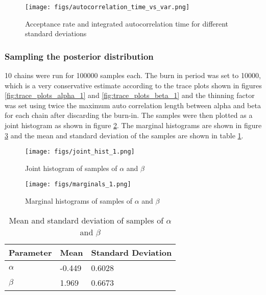\documentclass[11pt]{article}
\begin{document}
\begin{figure}[H]
    \centering
    \texttt{[image: figs/autocorrelation\_time\_vs\_var.png]}
    \caption{Acceptance rate and integrated autocorrelation time for different standard deviations}
    \label{fig:std_tuning}
\end{figure}

\subsubsection{Sampling the posterior distribution}
10 chains were run for 100000 samples each. The burn in period was set to 10000, which is a very conservative estimate according to the trace plots shown in figures \ref{fig:trace_plots_alpha_1} and \ref{fig:trace_plots_beta_1} and the thinning factor was set using twice the maximum auto correlation length between alpha and beta for each chain after discarding the burn-in. The samples were then plotted as a joint histogram as shown in figure \ref{fig:joint_hist_1}. The marginal histograms are shown in figure \ref{fig:marginal_hist} and the mean and standard deviation of the samples are shown in table \ref{tab:mean_std}.

\begin{figure}[H]
    \centering
    \texttt{[image: figs/joint\_hist\_1.png]}
    \caption{Joint histogram of samples of $\alpha$ and $\beta$}
    \label{fig:joint_hist_1}
\end{figure}

\begin{figure}[H]
    \centering
    \texttt{[image: figs/marginals\_1.png]}
    \caption{Marginal histograms of samples of $\alpha$ and $\beta$}
    \label{fig:marginal_hist}
\end{figure}

\begin{table}[H]
    \centering
    \begin{tabular}{@{}lll@{}}
    \toprule
    Parameter & Mean & Standard Deviation \\ \midrule
    $\alpha$  & -0.449 & 0.6028 \\
    $\beta$   & 1.969 & 0.6673 \\ \bottomrule
    \end{tabular}
    \caption{Mean and standard deviation of samples of $\alpha$ and $\beta$}
    \label{tab:mean_std}
\end{table}
\end{document}
